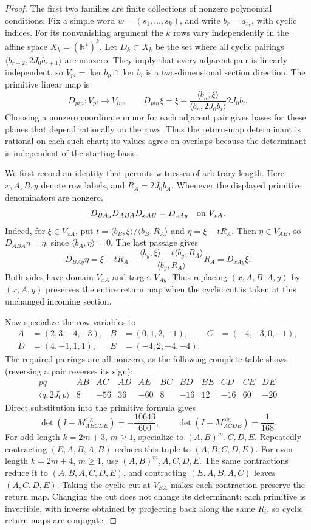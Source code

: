 \begin{proof}
The first two families are finite collections of nonzero polynomial
conditions.  Fix a simple word \(w=(s_1,\ldots,s_k)\), and write
\(b_r=a_{s_r}\), with cyclic indices.  For its nonvanishing argument the
\(k\) rows vary independently in the affine space
\(X_k=(\mathbb R^4)^k\).  Let \(D_k\subset X_k\) be the set where all
cyclic pairings \(\langle b_{r+2},2J_0b_{r+1}\rangle\) are nonzero.
They imply that every adjacent pair is linearly independent, so
\(V_{pi}=\ker b_p\cap\ker b_i\) is a two-dimensional section direction.
The primitive linear map is
\[
  D_{pin}:V_{pi}\longrightarrow V_{in},\qquad
  D_{pin}\xi=\xi-
  \frac{\langle b_n,\xi\rangle}{\langle b_n,2J_0b_i\rangle}
  2J_0b_i.
\]
Choosing a nonzero coordinate minor for each adjacent pair gives bases for
these planes that depend rationally on the rows.  Thus the return-map
determinant is rational on each such chart; its values agree on overlaps
because the determinant is independent of the starting basis.

We first record an identity that permits witnesses of arbitrary length.
Here \(x,A,B,y\) denote row labels, and \(R_A=2J_0b_A\).
Whenever the displayed primitive denominators are nonzero,
\[
  D_{BAy}D_{ABA}D_{xAB}=D_{xAy}
  \quad\hbox{on }V_{xA}.
\]
Indeed, for \(\xi\in V_{xA}\), put
\(t=\langle b_B,\xi\rangle/\langle b_B,R_A\rangle\) and
\(\eta=\xi-tR_A\).  Then \(\eta\in V_{AB}\), so
\(D_{ABA}\eta=\eta\), since \(\langle b_A,\eta\rangle=0\).
The last passage gives
\[
 D_{BAy}\eta
 =\xi-tR_A-
 \frac{\langle b_y,\xi\rangle-t\langle b_y,R_A\rangle}
      {\langle b_y,R_A\rangle}R_A
 =D_{xAy}\xi.
\]
Both sides have domain \(V_{xA}\) and target \(V_{Ay}\).  Thus replacing
\((x,A,B,A,y)\) by \((x,A,y)\) preserves the entire return map when the
cyclic cut is taken at this unchanged incoming section.

Now specialize the row variables to
\[
\begin{aligned}
 A&=(2,3,-4,-3),& B&=(0,1,2,-1),& C&=(-4,-3,0,-1),\\
 D&=(4,-1,1,1),& E&=(-4,2,-4,-4).
\end{aligned}
\]
The required pairings are all nonzero, as the following complete table
shows (reversing a pair reverses its sign):
\[
\begin{array}{c|rrrrrrrrrr}
 pq&AB&AC&AD&AE&BC&BD&BE&CD&CE&DE\\ \hline
 \langle q,2J_0p\rangle&8&-56&36&-60&8&-16&12&-16&60&-20
\end{array}
\]
Direct substitution into the primitive formula gives
\[
  \det(I-M_{ABCDE}^{\mathrm{alg}})=-\frac{10643}{600},
  \qquad
  \det(I-M_{ACDE}^{\mathrm{alg}})=\frac1{168}.
\]
For odd length \(k=2m+3\), \(m\geq1\), specialize to
\((A,B)^m,C,D,E\).  Repeatedly contracting \((E,A,B,A,B)\) reduces this
tuple to \((A,B,C,D,E)\).  For even length \(k=2m+4\), \(m\geq1\), use
\((A,B)^m,A,C,D,E\).  The same contractions reduce it to
\((A,B,A,C,D,E)\), and contracting \((E,A,B,A,C)\) leaves
\((A,C,D,E)\).  Taking the cyclic cut at \(V_{EA}\) makes each contraction
preserve the return map.  Changing the cut does not change its determinant:
each primitive is invertible, with inverse obtained by projecting back along
the same \(R_i\), so cyclic return maps are conjugate.


\end{proof}
